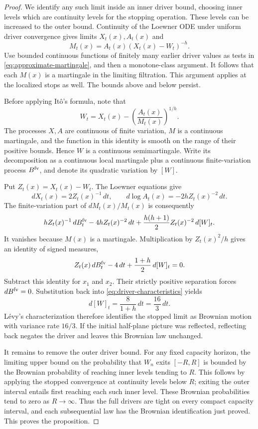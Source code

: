 \begin{proof}
We identify any such limit inside an inner driver bound, choosing
inner levels which are continuity levels for the stopping operation.
These levels can be increased to the outer bound.  Continuity of
the Loewner ODE under uniform driver convergence gives limits
$X_t(x),A_t(x)$ and
\begin{equation}\label{eq:limiting-power-test}
 M_t(x)=A_t(x)(X_t(x)-W_t)^{-h}.
\end{equation}
Use bounded continuous functions of finitely many earlier driver
values as tests in \eqref{eq:approximate-martingale}, and then a
monotone-class argument.  It follows that each $M(x)$ is a
martingale in the limiting filtration.  This argument applies at
the localized stops as well.  The bounds above and below persist.

Before applying It\^o's formula, note that
\[
 W_t=X_t(x)-\left(\frac{A_t(x)}{M_t(x)}\right)^{1/h}.
\]
The processes $X,A$ are continuous of finite variation, $M$ is a
continuous martingale, and the function in this identity is smooth
on the range of their positive bounds.  Hence $W$ is a continuous
semimartingale.  Write its decomposition as a continuous local
martingale plus a continuous finite-variation process $B^{\rm fv}$,
and denote its quadratic variation by $[W]$.

Put $Z_t(x)=X_t(x)-W_t$.  The Loewner equations give
\[
 dX_t(x)=2Z_t(x)^{-1}\,dt,\qquad
 d\log A_t(x)=-2hZ_t(x)^{-2}\,dt.
\]
The finite-variation part of $dM_t(x)/M_t(x)$ is consequently
\[
 hZ_t(x)^{-1}\,dB_t^{\rm fv}
 -4hZ_t(x)^{-2}\,dt
 +\frac{h(h+1)}{2}Z_t(x)^{-2}\,d[W]_t.
\]
It vanishes because $M(x)$ is a martingale.  Multiplication by
$Z_t(x)^2/h$ gives an identity of signed measures,
\begin{equation}\label{eq:driver-characteristics}
 Z_t(x)\,dB_t^{\rm fv}-4\,dt
      +\frac{1+h}{2}\,d[W]_t=0.
\end{equation}
Subtract this identity for $x_1$ and $x_2$.  Their strictly
positive separation forces $dB^{\rm fv}=0$.  Substitution back
into \eqref{eq:driver-characteristics} yields
\[
 d[W]_t=\frac{8}{1+h}\,dt=\frac{16}{3}\,dt.
\]
L\'evy's characterization therefore identifies the stopped limit
as Brownian motion with variance rate $16/3$.  If the initial
half-plane picture was reflected, reflecting back negates the
driver and leaves this Brownian law unchanged.

It remains to remove the outer driver bound.  For any fixed
capacity horizon, the limiting upper bound on the probability
that $W_n$ exits $[-R,R]$ is bounded by the Brownian probability
of reaching inner levels tending to $R$.  This follows by applying
the stopped convergence at continuity levels below $R$; exiting
the outer interval entails first reaching each such inner level.
These Brownian probabilities tend to zero as $R\to\infty$.
Thus the full drivers are tight on every compact capacity
interval, and each subsequential law has the Brownian
identification just proved.  This proves the proposition.
\end{proof}

